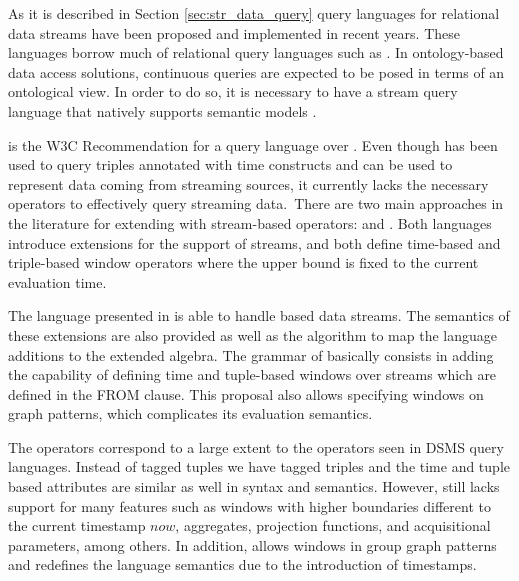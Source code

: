 As it is described in Section \ref{sec:str_data_query} query languages for relational data streams have been proposed and implemented in recent years. These languages borrow much of relational query languages such as \sql. In ontology-based data access solutions, continuous queries are expected to be posed in terms of an ontological view. In order to do so, it is necessary to have a stream query language that natively supports semantic models \cite{DellaValle_09,Groppe_07}.

\sparql \cite{Prudhommeaux_2008} is the W3C Recommendation for a query language over \rdf. Even though  \sparql has been used to query \rdf triples annotated with time constructs and can be used to represent data coming from streaming sources, it currently lacks the necessary operators to effectively query streaming data.\
There are two main approaches in the literature for extending \sparql with stream-based operators: \streamingsparql and \csparql.
Both languages introduce extensions for the support of \rdf streams, and both define time-based and triple-based window operators where the upper bound is fixed to the current evaluation time. 


The \streamingsparql language presented in \cite{Bolles_08} is able to handle \rdf based data streams. The semantics of these extensions are also provided as well as the algorithm to map the language additions to the extended algebra. The grammar of \streamingsparql basically consists in adding the capability of defining time and tuple-based windows over streams which are defined in the \textsf{FROM} clause. %
This proposal also allows specifying windows on graph patterns, which complicates its evaluation semantics. %


The operators correspond to a large extent to the operators seen in DSMS query languages. %
Instead of tagged tuples we have tagged triples and the time and tuple based attributes are similar as well in syntax
and semantics. However, \streamingsparql still lacks support for many features such as windows with higher boundaries
different to the current timestamp $now$, aggregates, projection functions, and acquisitional parameters, among others.
In addition, \streamingsparql allows windows in group graph patterns and redefines the language semantics due to the
introduction of timestamps.

